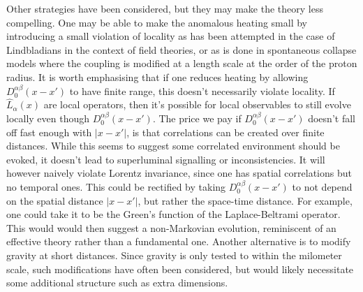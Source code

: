 \documentclass[aps,pra,showpacs,citeautoscript,amsmath,amssymb,floatfix,superscriptaddress,bbm, verbatim,amsfonts,changes,10pt,nofootinbib,longbibliography]{revtex4-1}
\def\L{{\hat{L}}}
\def\ab{^{\alpha\beta}}
\begin{document}
Other strategies have been considered, but they may make the theory less compelling. One may be able to make the anomalous heating small by introducing a small violation of locality as has been attempted in the case of Lindbladians in the context of field theories\cite{poulinKITP}, or as is done in spontaneous collapse models where the coupling is modified at a length scale at the order of the proton radius. 
It is worth emphasising that if one reduces heating by allowing  $D_0\ab(x-x')$ to have finite range, this doesn't necessarily violate locality. If $\L_{\alpha}(x)$ are local operators, then it's possible for local observables to still evolve locally even though $D_0\ab(x-x')$.  The price we pay if $D_0\ab(x-x')$ doesn't fall off fast enough with  $|x-x'|$, is that correlations can be created over finite distances\cite{bps, OR-intrinsic}. While this seems to suggest some  correlated environment should be evoked, it doesn't lead to superluminal signalling or inconsistencies. It will however naively violate Lorentz invariance, since one has spatial correlations but no temporal ones. This could be rectified by taking $D_0\ab(x-x')$ to not  depend on the spatial distance $|x-x'|$, but rather the space-time distance. For example, one could take it to be the Green's function of the Laplace-Beltrami operator. This would would then suggest a non-Markovian evolution, reminiscent of an effective theory rather than a fundamental one. 
Another alternative is to modify gravity at short distances. Since gravity is only tested to within the milometer scale, such modifications have often been considered, but would likely necessitate some additional structure such as extra dimensions\cite{arkani1998hierarchy}.
\end{document}
